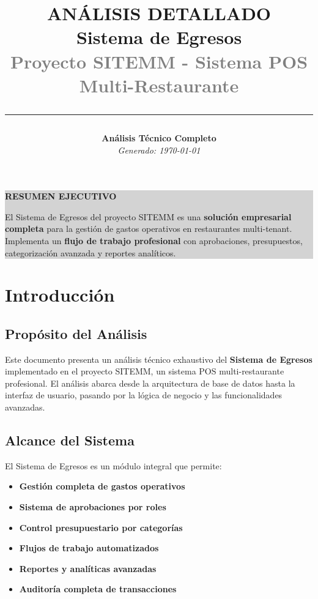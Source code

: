 \documentclass[12pt,a4paper]{article}
\title{
    \vspace{-2cm}
    {\Huge\textcolor{primaryblue}{\textbf{ANÁLISIS DETALLADO}}} \\[0.5cm]
    {\LARGE\textcolor{secondarygreen}{\textbf{Sistema de Egresos}}} \\[0.3cm]
    {\large\textcolor{gray}{Proyecto SITEMM - Sistema POS Multi-Restaurante}} \\[0.5cm]
    \rule{\textwidth}{2pt}
}
\author{
    \textbf{Análisis Técnico Completo} \\
    \textit{Generado: \today}
}
\date{}
\newcommand{\highlight}[1]{\textcolor{primaryblue}{\textbf{#1}}}
\newcommand{\success}[1]{\textcolor{secondarygreen}{\textbf{#1}}}
\begin{document}
\maketitle
\thispagestyle{fancy}

\vspace{1cm}

\begin{center}
\colorbox{lightgray}{
\begin{minipage}{0.9\textwidth}
\centering
\textcolor{primaryblue}{\Large\textbf{RESUMEN EJECUTIVO}}
\vspace{0.3cm}

El Sistema de Egresos del proyecto SITEMM es una \highlight{solución empresarial completa} para la gestión de gastos operativos en restaurantes multi-tenant. Implementa un \success{flujo de trabajo profesional} con aprobaciones, presupuestos, categorización avanzada y reportes analíticos.
\end{minipage}
}
\end{center}

\vspace{1cm}

\tableofcontents
\newpage


\section{Introducción}

\subsection{Propósito del Análisis}
Este documento presenta un análisis técnico exhaustivo del \highlight{Sistema de Egresos} implementado en el proyecto SITEMM, un sistema POS multi-restaurante profesional. El análisis abarca desde la arquitectura de base de datos hasta la interfaz de usuario, pasando por la lógica de negocio y las funcionalidades avanzadas.

\subsection{Alcance del Sistema}
El Sistema de Egresos es un módulo integral que permite:
\begin{itemize}[leftmargin=*]
    \item \success{Gestión completa de gastos operativos}
    \item \success{Sistema de aprobaciones por roles}
    \item \success{Control presupuestario por categorías}
    \item \success{Flujos de trabajo automatizados}
    \item \success{Reportes y analíticas avanzadas}
    \item \success{Auditoría completa de transacciones}
\end{itemize}
\end{document}
